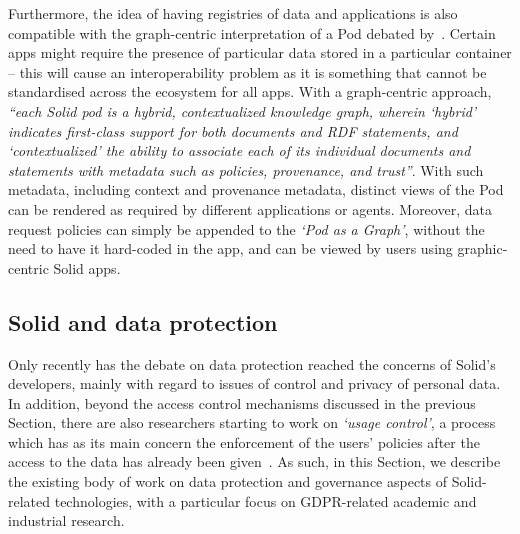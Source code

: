 Furthermore, the idea of having registries of data and applications is also compatible with the graph-centric interpretation of a Pod debated by~\cite{dedecker_whats_2022}.
Certain apps might require the presence of particular data stored in a particular container -- this will cause an interoperability problem as it is something that cannot be standardised across the ecosystem for all apps.
With a graph-centric approach, \textit{``each Solid pod is a hybrid, contextualized knowledge graph, wherein `hybrid' indicates first-class support for both documents and RDF statements, and `contextualized' the ability to associate each of its individual documents and statements with metadata such as policies, provenance, and trust''}.
With such metadata, including context and provenance metadata, distinct views of the Pod can be rendered as required by different applications or agents.
Moreover, data request policies can simply be appended to the \textit{`Pod as a Graph'}, without the need to have it hard-coded in the app, and can be viewed by users using graphic-centric Solid apps.

\subsection{Solid and data protection}
\label{sec:sota_solid_data_protection}

Only recently has the debate on data protection reached the concerns of Solid's developers, mainly with regard to issues of control and privacy of personal data.
In addition, beyond the access control mechanisms discussed in the previous Section, there are also researchers starting to work on \textit{`usage control'}, a process which has as its main concern the enforcement of the users' policies after the access to the data has already been given~\citep{akaichi_semantic_2022,havur_greater_2020}.
As such, in this Section, we describe the existing body of work on data protection and governance aspects of Solid-related technologies, with a particular focus on GDPR-related academic and industrial research.

